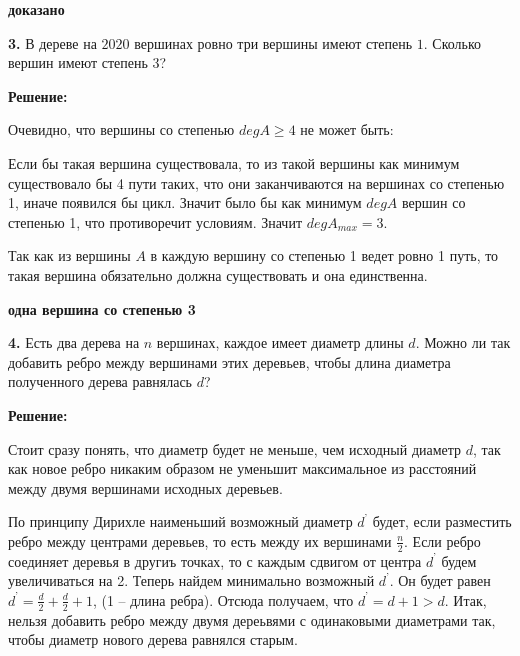 \documentclass[a4paper,12pt]{article} %
\begin{document}
\begin{flushright}
\begin{large}
\textbf {доказано}
\end{large}
\end{flushright}
\newpage
{\bf 3.} В дереве на $2020$ вершинах ровно три вершины имеют степень $1$.
Сколько вершин имеют степень $3$? 
\begin{center}
\bfseries
{\Large Решение: }
\end{center}

Очевидно, что вершины со степенью $degA \geqslant 4$ не может быть:

Если бы такая вершина существовала, то из такой вершины как минимум существовало бы 4 пути таких, что они заканчиваются на вершинах со степенью 1, иначе появился бы цикл. Значит было бы как минимум $degA$ вершин со степенью 1, что противоречит условиям. Значит $degA_{max} = 3$.

Так как из вершины $A$ в каждую вершину со степенью 1 ведет ровно 1 путь, то такая вершина обязательно должна существовать и она единственна.

\begin{flushright}
\begin{large}
\textbf {одна вершина со степенью 3 }
\end{large}
\end{flushright}

{\bf 4. }Есть два дерева на $ n$ вершинах, каждое имеет диаметр длины $d$.
Можно ли так добавить ребро между вершинами этих деревьев, чтобы
длина диаметра полученного дерева равнялась $d$? 
\begin{center}
\bfseries
{\Large Решение: }
\end{center}

Стоит сразу понять, что диаметр будет не меньше, чем исходный диаметр $d$, так как новое ребро никаким образом не уменьшит максимальное из расстояний между двумя вершинами исходных деревьев.

По принципу Дирихле наименьший возможный диаметр $d^{\textbf{'}}$ будет, если разместить ребро между центрами деревьев, то есть между их вершинами $\frac{n}{2}$. Если ребро соединяет деревья в другиъ точках, то с каждым сдвигом от центра $d^{\textbf{'}}$ будем увеличиваться на 2. Теперь найдем минимально возможный $d^{\textbf{'}}$. Он будет равен $d^{\textbf{'}} = \frac{d}{2} + \frac{d}{2}+ 1$, (1 -- длина ребра). Отсюда получаем, что $d^{\textbf{'}} = d + 1 > d$. Итак, нельзя добавить ребро между двумя дереьвями с одинаковыми диаметрами так, чтобы диаметр нового дерева равнялся старым.
\end{document}
